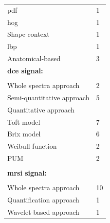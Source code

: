\documentclass[num-refs]{wiley-article}
\begin{document}
\begin{table}
\begin{threeparttable}
\begin{tabular}{p{.5\linewidth} p{.4\linewidth}}
      \quad \quad \quad \acs{pdf} & 1 \\
      \quad \quad \quad \acs{hog} & 1 \\
      \quad \quad \quad Shape context & 1 \\
      \quad \quad \quad \acs{lbp} & 1 \\
      \quad \quad Anatomical-based & 3 \\
      \textbf{\ac{dce} signal:} & \\ \\ [-1.5ex]
      \quad Whole spectra approach & 2 \\
      \quad Semi-quantitative approach & 5 \\
      \quad Quantitative approach &  \\
      \quad \quad Toft model & 7 \\
      \quad \quad Brix model & 6 \\
      \quad \quad Weibull function & 2 \\
      \quad \quad PUM & 2 \\
      \\ [-1.5ex]
      \textbf{\ac{mrsi} signal:} & \\ \\ [-1.5ex]
      \quad Whole spectra approach & 10 \\
      \quad Quantification approach & 1 \\
      \quad Wavelet-based approach & 1 \\
      \hline
    \end{tabular}
  \end{threeparttable}
\end{table}



\end{document}
